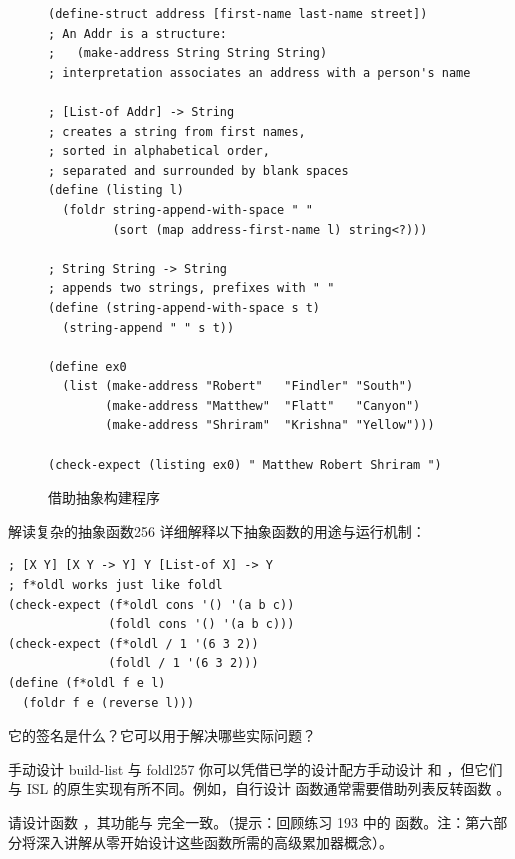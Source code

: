 \begin{figure}[htbp]
  \centering
\begin{lstlisting}[language=BSL, basicstyle=\scriptsize\ttfamily]
(define-struct address [first-name last-name street])
; An Addr is a structure:
;   (make-address String String String)
; interpretation associates an address with a person's name

; [List-of Addr] -> String
; creates a string from first names,
; sorted in alphabetical order,
; separated and surrounded by blank spaces
(define (listing l)
  (foldr string-append-with-space " "
         (sort (map address-first-name l) string<?)))

; String String -> String
; appends two strings, prefixes with " "
(define (string-append-with-space s t)
  (string-append " " s t))

(define ex0
  (list (make-address "Robert"   "Findler" "South")
        (make-address "Matthew"  "Flatt"   "Canyon")
        (make-address "Shriram"  "Krishna" "Yellow")))

(check-expect (listing ex0) " Matthew Robert Shriram ")
\end{lstlisting}
  \caption{借助抽象构建程序}
  \label{fig:97}
\end{figure}

\begin{exercise}{解读复杂的抽象函数}{256}
详细解释以下抽象函数的用途与运行机制：

\begin{lstlisting}[language=BSL]
; [X Y] [X Y -> Y] Y [List-of X] -> Y
; f*oldl works just like foldl
(check-expect (f*oldl cons '() '(a b c))
              (foldl cons '() '(a b c)))
(check-expect (f*oldl / 1 '(6 3 2))
              (foldl / 1 '(6 3 2)))
(define (f*oldl f e l)
  (foldr f e (reverse l)))
\end{lstlisting}

它的签名是什么？它可以用于解决哪些实际问题？
\end{exercise}

\begin{exercise}{手动设计 build-list 与 foldl}{257}
你可以凭借已学的设计配方手动设计  和 ，但它们与 ISL 的原生实现有所不同。例如，自行设计  函数通常需要借助列表反转函数 。

请设计函数 ，其功能与  完全一致。（提示：回顾练习 193 中的  函数。注：第六部分将深入讲解从零开始设计这些函数所需的高级累加器概念）。
\end{exercise}

